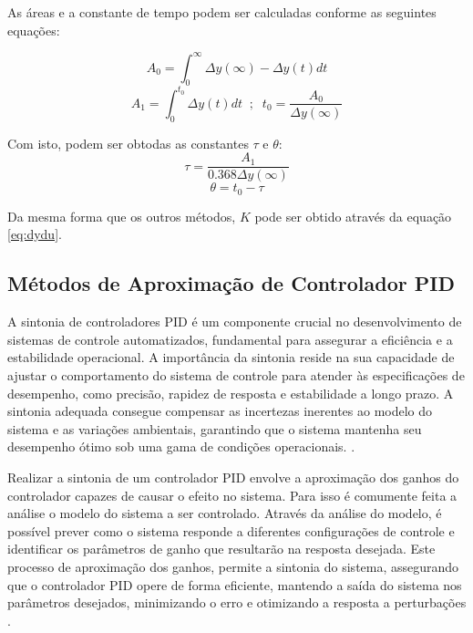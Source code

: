 As áreas e a constante de tempo podem ser calculadas conforme as seguintes equações:

\begin{equation}
    \label{eq:nia0}
    A_0 = \int_{0}^{\infty} { \Delta y(\infty) - \Delta y(t) } dt
\end{equation}
\begin{equation}
    \label{eq:nia1nt0}
    A_1 = \int_{0}^{t_0} \Delta y(t) dt \;\; ; \;\; t_0 = \frac{A_0}{\Delta y(\infty)}
\end{equation}

Com isto, podem ser obtodas as constantes $\tau$ e $\theta$:
\begin{equation}
    \label{eq:nitau}
    \tau = \frac{A_1}{0.368\Delta y(\infty)}
\end{equation}
\begin{equation}
    \label{eq:nitheta}
    \theta = t_0 - \tau
\end{equation}

Da mesma forma que os outros métodos, $K$ pode ser obtido através da equação \eqref{eq:dydu}.

\subsection{Métodos de Aproximação de Controlador PID}

A sintonia de controladores PID é um componente crucial no desenvolvimento de sistemas de controle automatizados,
fundamental para assegurar a eficiência e a estabilidade operacional.
A importância da sintonia reside na sua capacidade de ajustar o comportamento do sistema de controle para atender às
especificações de desempenho, como precisão, rapidez de resposta e estabilidade a longo prazo.
A sintonia adequada consegue compensar as incertezas inerentes ao modelo do sistema e as variações ambientais,
garantindo que o sistema mantenha seu desempenho ótimo sob uma gama de condições operacionais.
\cite{apostpidsint}.

Realizar a sintonia de um controlador PID envolve a aproximação dos ganhos do controlador capazes de causar o efeito no
sistema.
Para isso é comumente feita a análise o modelo do sistema a ser controlado.
Através da análise do modelo, é possível prever como o sistema responde a diferentes configurações de controle e
identificar os parâmetros de ganho que resultarão na resposta desejada.
Este processo de aproximação dos ganhos, permite a sintonia do sistema, assegurando que o controlador PID opere de forma
eficiente, mantendo a saída do sistema nos parâmetros desejados, minimizando o erro e otimizando a resposta a
perturbações \cite{apostpidsint}.


